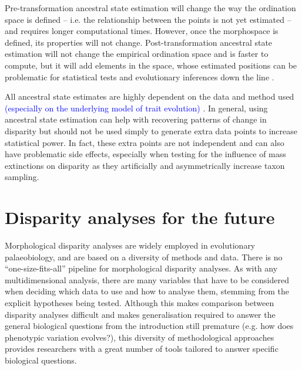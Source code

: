\documentclass[12pt,letterpaper]{article}
\begin{document}
Pre-transformation ancestral state estimation will change the way the ordination space is defined -- i.e.
the relationship between the points is not yet estimated -- and requires longer computational times.
However, once the morphospace is defined, its properties will not change.
Post-transformation ancestral state estimation will not change the empirical ordination space and is faster to compute, but it will add elements in the space, whose estimated positions can be problematic for statistical tests and evolutionary inferences down the line \citep{lloyd2018}.

All ancestral state estimates are highly dependent on the data and method used \textcolor{blue}{(especially on the underlying model of trait evolution)} \cite{louca2020}.
In general, using ancestral state estimation can help with recovering patterns of change in disparity but should not be used simply to generate extra data points to increase statistical power.
In fact, these extra points are not independent and can also have problematic side effects, especially when testing for the influence of mass extinctions on disparity as they artificially and asymmetrically increase taxon sampling.

\section{Disparity analyses for the future} \label{section:future}

\noindent Morphological disparity analyses are widely employed in evolutionary palaeobiology, and are based on a diversity of methods and data.
There is no ``one-size-fits-all'' pipeline for morphological disparity analyses.
As with any multidimensional analysis, there are many variables that have to be considered when deciding which data to use and how to analyse them, stemming from the explicit hypotheses being tested.
Although this makes comparison between disparity analyses difficult and makes generalisation required to answer the general biological questions from the introduction still premature (e.g. how does phenotypic variation evolves?), this diversity of methodological approaches provides researchers with a great number of tools tailored to answer specific biological questions.
\end{document}
